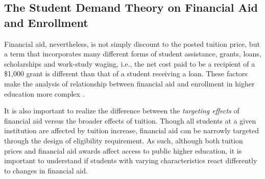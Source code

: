 \documentclass[12pt,english]{report}
\begin{document}
%

\subsection{The Student Demand Theory on Financial Aid and Enrollment}
Financial aid, nevertheless, is not simply discount to the posted tuition
price, but  a term that incorporates many different forms of student
assistance,
grants, loans, scholarships and work-study waging, i.e., the net cost paid to
be a recipient of a \$1,000 grant is different than that of a student receiving
a
loan.  These factors make the analysis of relationship between financial aid
and enrollment in higher education more complex \citep{Heller1997}.

It is also important to realize the difference between the \textit{targeting
effects}  of financial aid versus the broader effects of tuition. Though all
students at a given institution are affected by tuition increase, financial aid
can be narrowly targeted through the design of eligibility requirement.  As
such, although both tuition prices and financial aid awards affect access to
public higher education, it is important to understand if students with varying
characteristics react differently to changes in financial aid.
\end{document}
